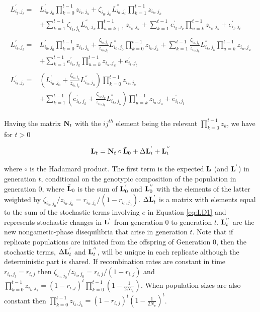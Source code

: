 \documentclass[12pt]{article}
\begin{document}
\begin{bibunit}
\begin{equation}
\begin{array}{rl}
\\
L^{'}_{i_{t},j_{t}} =&L^{'}_{i_{0},j_{0}}\prod_{k=0}^{t-1}z_{i_{k},j_{k}}+\zeta_{i_{0},j_{0}}L^{''}_{i_{0},j_{0}}\prod_{k=1}^{t-1}z_{i_{k},j_{k}}\\
&+\sum_{k=1}^{t-1}\zeta_{i_{k},j_{k}}L^{''}_{i_{k},j_{k}}\prod_{u=k+1}^{t-1}z_{i_{u},j_{u}}+\sum_{k=1}^{t-1}e^{'}_{i_{k},j_{k}}\prod_{u=k}^{t-1}z_{i_{u},j_{u}}+e^{'}_{i_{t},j_{t}}\\
\\
L^{'}_{i_{t},j_{t}} =&L^{'}_{i_{0},j_{0}}\prod_{k=0}^{t-1}z_{i_{k},j_{k}}+\frac{\zeta_{i_{0},j_{0}}}{z_{i_{0},j_{0}}}L^{''}_{i_{0},j_{0}}\prod_{k=0}^{t-1}z_{i_{k},j_{k}}+\sum_{k=1}^{t-1}\frac{\zeta_{i_{k},j_{k}}}{z_{i_{k},j_{k}}}L^{''}_{i_{k},j_{k}}\prod_{u=k}^{t-1}z_{i_{u},j_{u}}\\
&+\sum_{k=1}^{t-1}e^{'}_{i_{k},j_{k}}\prod_{u=k}^{t-1}z_{i_{u},j_{u}}+e^{'}_{i_{t},j_{t}}\\
\\
L^{'}_{i_{t},j_{t}} =&\left(L^{'}_{i_{0},j_{0}}+\frac{\zeta_{i_{0},j_{0}}}{z_{i_{0},j_{0}}}L^{''}_{i_{0},j_{0}}\right)\prod_{k=0}^{t-1}z_{i_{k},j_{k}}\\
&+\sum_{k=1}^{t-1}\left(e^{'}_{i_{k},j_{k}}+\frac{\zeta_{i_{k},j_{k}}}{z_{i_{k},j_{k}}}L^{''}_{i_{k},j_{k}}\right) \prod_{u=k}^{t-1}z_{i_{u},j_{u}}+e^{'}_{i_{t},j_{t}}
\end{array}
\label{eq:LD1}
\end{equation}
\\
 Having the matrix ${\bf N}_t$ with the $ij^{th}$ element being the relevant $\prod_{k=0}^{t-1}z_k$, we have for $t>0$
 
\begin{equation}
{\bf L}_{t}= {\bf N}_t\circ\tilde{\bf L}_{0}+\Delta {\bf L}^{'}_t+{\bf L}^{''}_t
\label{eq:LD3}
\end{equation}
 
where $\circ$ is the Hadamard product. The first term is the expected ${\bf L}$ (and ${\bf L}^{'}$) in generation $t$, conditional on the genotypic composition of the population in generation 0, where $\tilde{\bf L}_{0}$ is the sum of ${\bf L}^{'}_{0}$ and ${\bf L}^{''}_{0}$ with the elements of the latter weighted by $\zeta_{i_{0},j_{0}}/z_{i_{0},j_{0}}=r_{i_0,j_0}/(1-r_{i_0,j_0})$. $\Delta {\bf L}^{'}_t$ is a matrix with elements equal to the sum of the stochastic terms involving $e$ in Equation \ref{eq:LD1} and represents stochastic changes in ${\bf L}^{'}$ from generation 0 to generation $t$. ${\bf L}^{''}_t$ are the new nongametic-phase disequilibria that arise in generation $t$. Note that if replicate populations are initiated from the offspring of Generation $0$, then the stochastic terms, $\Delta {\bf L}^{'}_t$ and ${\bf L}^{''}_t$, will be unique in each replicate although the deterministic part is shared. If recombination rates are constant in time $r_{i_t, j_t}=r_{i, j}$ then $\zeta_{i_{0},j_{0}}/z_{i_{0},j_{0}} = r_{i,j}/(1-r_{i,j})$ and $\prod_{k=0}^{t-1}z_{i_{k},j_{k}} =(1-r_{i,j})^{t}\prod_{k=0}^{t-1}(1-\frac{1}{2N_{e_k}})$. When population sizes are also constant then $\prod_{k=0}^{t-1}z_{i_{k},j_{k}} =(1-r_{i,j})^{t}(1-\frac{1}{2N_e})^t$. 



\end{bibunit}
\end{document}
